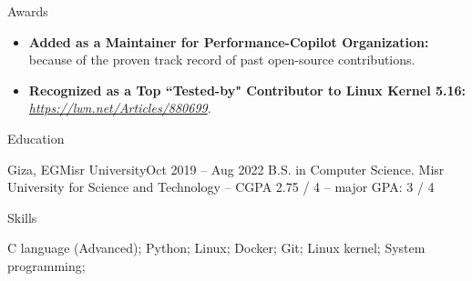 \documentclass[]{Sohaib-Mohamed}
\begin{document}
\begin{cvsection}{Awards}
   \begin{cvsubsection}{}{}{}
      \begin{itemize}
         \item \textbf{Added as a Maintainer for Performance-Copilot Organization:} because of the proven track record of past open-source contributions.
         \item \textbf{Recognized as a Top ``Tested-by" Contributor to Linux Kernel 5.16:} \href{https://lwn.net/Articles/880699/}{\textit{https://lwn.net/Articles/880699}}.
      \end{itemize}
   \end{cvsubsection}
\end{cvsection}


\begin{cvsection}{Education}
   \begin{cvsubsection}{Giza, EG}{Misr University}{Oct 2019 -- Aug 2022}
      B.S. in Computer Science. Misr University for Science and Technology -- CGPA 2.75 / 4 -- major GPA: 3 / 4
   \end{cvsubsection}
\end{cvsection}


\begin{cvsection}{Skills}
   \begin{cvsubsection}{}{}{}
      C language (Advanced); Python; Linux; Docker; Git; Linux kernel; System programming;
   \end{cvsubsection}
\end{cvsection}
\end{document}
